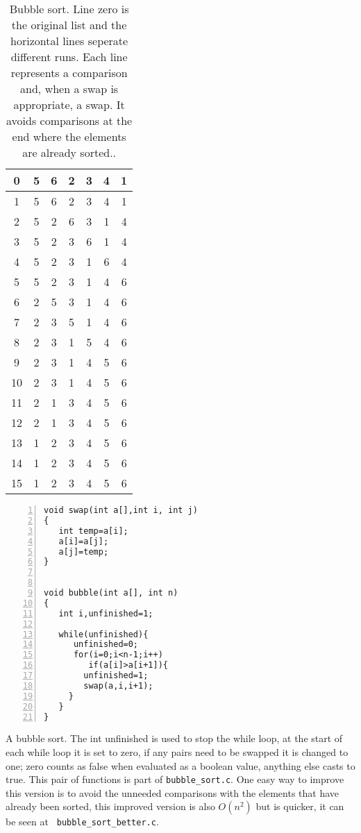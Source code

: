 \documentclass[11pt,a4paper]{scrartcl}
\begin{document}
\begin{table}
\begin{tabular}{c|cccccc}
0&5&6&2&3&4&1\\
\hline
1&5&6&2&3&4&1\\
2&5&2&6&3&1&4\\
3&5&2&3&6&1&4\\
4&5&2&3&1&6&4\\
5&5&2&3&1&4&6\\
\hline
6&2&5&3&1&4&6\\
7&2&3&5&1&4&6\\
8&2&3&1&5&4&6\\
9&2&3&1&4&5&6\\
\hline
10&2&3&1&4&5&6\\
11&2&1&3&4&5&6\\
12&2&1&3&4&5&6\\
\hline
13&1&2&3&4&5&6\\
14&1&2&3&4&5&6\\
\hline
15&1&2&3&4&5&6\\
\end{tabular}
\caption{Bubble sort. Line zero is the original list and the
  horizontal lines seperate different runs. Each line represents a
  comparison and, when a swap is appropriate, a swap. It avoids
  comparisons at the end where the elements are already
  sorted.. \label{table_bubble}}
\end{table}

\begin{table}
\begin{lstlisting}[numbers=left]
void swap(int a[],int i, int j)
{
   int temp=a[i];
   a[i]=a[j];
   a[j]=temp;
}


void bubble(int a[], int n)
{
   int i,unfinished=1;
  
   while(unfinished){
      unfinished=0;
      for(i=0;i<n-1;i++)
         if(a[i]>a[i+1]){
	    unfinished=1;
	    swap(a,i,i+1);	    
	 }
   }
}
\end{lstlisting}
\caption{A bubble sort. The int unfinished is used to stop the while
  loop, at the start of each while loop it is set to zero, if any
  pairs need to be swapped it is changed to one; zero counts as false
  when evaluated as a boolean value, anything else casts to true. This
  pair of functions is part of \texttt{bubble\_sort.c}. One easy way to
  improve this version is to avoid the unneeded comparisons with the
  elements that have already been sorted, this improved version is
  also $O(n^2)$ but is quicker, it can be seen at \texttt{
    bubble\_sort\_better.c}. \label{c_bubble}}
\end{table}
\end{document}

